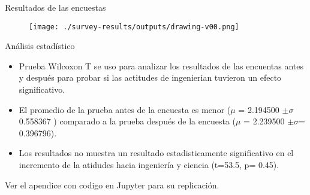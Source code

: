 {


\begin{frame}{
Resultados de las encuestas
}
      \begin{figure}
        \centering
        \texttt{[image: ./survey-results/outputs/drawing-v00.png]}
      \end{figure}
\end{frame}
}



{

\begin{frame}{An\'alisis estad\'istico}

\begin{itemize}
\item Prueba Wilcoxon T se uso para analizar los resultados de las encuentas antes y despu\'es para probar si las actitudes de ingenierian tuvieron un efecto significativo.
\item El promedio de la prueba antes de la encuesta es menor ($\mu$ = 2.194500 $\pm \sigma$ 0.558367 ) comparado a la prueba despu\'es de la encuesta ($\mu$ = 2.239500 $\pm \sigma$= 0.396796).
\item Los resultados no muestra un resultado estadisticamente significativo en el incremento de la atidudes hacia ingenier\'ia y ciencia (t=53.5, p= 0.45).
\end{itemize}

Ver el apendice con codigo en Jupyter para su replicaci\'on.

\end{frame}
}

